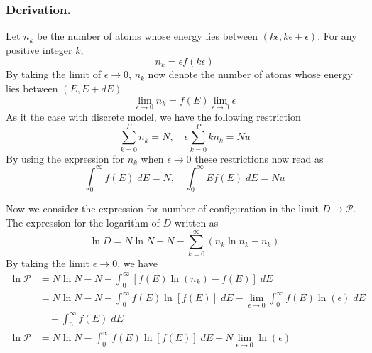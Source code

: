 \documentclass[../../../Main.tex]{subfiles}
\begin{document}
\subsubsection*{Derivation.} Let $n_k$ be the number of atoms whose energy lies between $(k\epsilon, k\epsilon+\epsilon)$. For any positive integer $k$, 
\begin{equation*}
    n_k=\epsilon f(k\epsilon)
\end{equation*}
By taking the limit of $\epsilon\rightarrow0$, $n_k$ now denote the number of atoms whose energy lies between $(E, E+dE)$
\begin{equation*}
   \lim_{\epsilon\rightarrow0} n_k=f(E)\lim_{\epsilon\rightarrow0}\epsilon
\end{equation*}
As it the case with discrete model, we have the following restriction
\begin{equation*}
    \sum_{k=0}^{P}n_k=N,\quad \epsilon\sum_{k=0}^{P} kn_k=Nu
\end{equation*}
By using the expression for $n_k$ when $\epsilon\rightarrow0$ these restrictions now read as
\begin{equation*}
    \int_{0}^{\infty}f(E)\;dE=N,\quad \int_{0}^{\infty}Ef(E)\;dE=Nu
\end{equation*}

Now we consider the expression for number of configuration in the limit $D\rightarrow\mathcal{P}$. The expression for the logarithm of $D$ written as
\begin{equation*}
    \ln D=N\ln N-N-\sum_{k=0}^{\infty}\left(n_k\ln n_k-n_k\right)
\end{equation*}
By taking the limit $\epsilon\rightarrow0$, we have
\begin{align*}
    \ln \mathcal{P} &= N\ln N-N-\int_{0}^{\infty}\left[f(E)\ln (n_k)-f(E)\right]\;dE\\
    & = N\ln N-N-\int_{0}^{\infty}f(E)\ln[ f(E)]\;dE - \lim_{\epsilon\rightarrow0}\int_{0}^{\infty}f(E)\ln(\epsilon)\;dE \\
    &\quad+  \int_{0}^{\infty}f(E)\;dE \\
    \ln \mathcal{P}&=N\ln N-\int_{0}^{\infty}f(E)\ln [f(E)]\;dE - N\lim_{\epsilon\rightarrow0}\ln(\epsilon) 
\end{align*}
\end{document}
